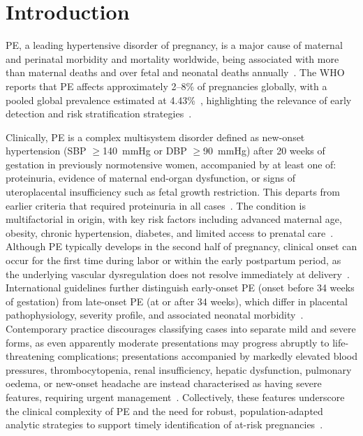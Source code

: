 \documentclass[diagnostics,article,submit,pdftex,moreauthors]{Definitions/mdpi}
\begin{document}

\section{Introduction}
\label{sec:introduction}
\Ac{PE}, a leading hypertensive disorder of pregnancy, is
a major cause of maternal and perinatal morbidity and mortality
worldwide, being associated with more than 
maternal deaths and over  fetal and neonatal deaths
annually~\cite{vera2025preeclampsia}. The \ac{WHO} reports that \ac{PE}
affects approximately 2--8\% of pregnancies globally, with
a pooled global prevalence estimated at 4.43\%~\cite{vera2025preeclampsia},
highlighting the relevance of early detection and risk stratification
strategies~\cite{who_2025_preeclampsia,vera2025preeclampsia}.

Clinically, \ac{PE} is a complex multisystem disorder
defined as new-onset hypertension (\ac{SBP} $\geq$140~mmHg or
\ac{DBP} $\geq$90~mmHg) after 20 weeks of gestation in previously
normotensive women, accompanied by at least one of: proteinuria,
evidence of maternal end-organ dysfunction, or signs of uteroplacental
insufficiency such as fetal growth restriction. This departs from earlier
criteria that required proteinuria in all
cases~\cite{brown2018isshp,vera2025preeclampsia}. The condition is
multifactorial in origin, with key risk factors including advanced
maternal age, obesity, chronic hypertension, diabetes, and limited
access to prenatal care~\cite{vera2025preeclampsia}. Although \ac{PE}
typically develops in the second half of pregnancy, clinical onset can
occur for the first time during labor or within the early postpartum
period, as the underlying vascular dysregulation does not resolve
immediately at delivery~\cite{brown2018isshp}.
International guidelines further distinguish early-onset \ac{PE} (onset
before 34 weeks of gestation) from late-onset \ac{PE} (at or after 34
weeks), which differ in placental pathophysiology, severity profile, and
associated neonatal morbidity~\cite{brown2018isshp}. Contemporary
practice discourages classifying cases into separate mild and severe
forms, as even apparently moderate presentations may progress abruptly
to life-threatening complications; presentations accompanied by markedly
elevated blood pressures, thrombocytopenia, renal insufficiency, hepatic
dysfunction, pulmonary oedema, or new-onset headache are instead
characterised as having severe features, requiring urgent
management~\cite{brown2018isshp}. Collectively, these features underscore
the clinical complexity of \ac{PE} and the need for robust,
population-adapted analytic strategies to support timely identification
of at-risk pregnancies~\cite{vera2025preeclampsia}.
\end{document}
